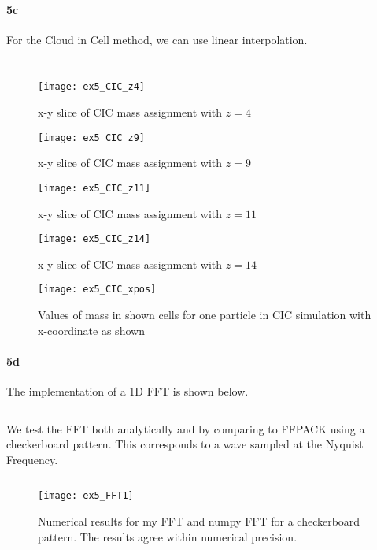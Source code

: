 \paragraph{5c}
For the Cloud in Cell method, we can use linear interpolation.

\inputminted[firstline=34, lastline=58]{Python}{../pm_utils.py}
\inputminted[firstline=40, lastline=63]{Python}{../ex5.py}

\begin{figure}[h]
  \centering
  \texttt{[image: ex5\_CIC\_z4]}
  \caption{x-y slice of CIC mass assignment with $z=4$}
\end{figure}

\begin{figure}[h]
  \centering
  \texttt{[image: ex5\_CIC\_z9]}
  \caption{x-y slice of CIC mass assignment with $z=9$}
\end{figure}

\begin{figure}[h]
  \centering
  \texttt{[image: ex5\_CIC\_z11]}
  \caption{x-y slice of CIC mass assignment with $z=11$}
\end{figure}

\begin{figure}[h]
  \centering
  \texttt{[image: ex5\_CIC\_z14]}
  \caption{x-y slice of CIC mass assignment with $z=14$}
\end{figure}

\clearpage
\begin{figure}[h]
  \centering
  \texttt{[image: ex5\_CIC\_xpos]}
  \caption{Values of mass in shown cells for one particle in CIC simulation with x-coordinate as shown}
\end{figure}

\paragraph{5d}
The implementation of a 1D FFT is shown below.

\inputminted[firstline=5, lastline=54]{Python}{../fft.py}

We test the FFT both analytically and by comparing to FFPACK using a checkerboard pattern.
This corresponds to a wave sampled at the Nyquist Frequency.

\inputminted[firstline=65, lastline=82]{Python}{../ex5.py}

\begin{figure}[h]
  \centering
  \texttt{[image: ex5\_FFT1]}
  \caption{Numerical results for my FFT and numpy FFT for a checkerboard pattern.
  The results agree within numerical precision.}
\end{figure}

